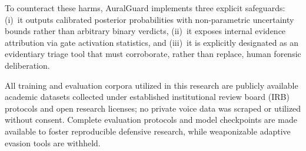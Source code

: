 To counteract these harms, AuralGuard implements three explicit safeguards:
(i)~it outputs calibrated posterior probabilities with non-parametric uncertainty bounds rather than arbitrary binary verdicts,
(ii)~it exposes internal evidence attribution via gate activation statistics, and
(iii)~it is explicitly designated as an evidentiary triage tool that must corroborate, rather than replace, human forensic deliberation. 

All training and evaluation corpora utilized in this research are publicly available academic datasets collected under established institutional review board (IRB) protocols and open research licenses; no private voice data was scraped or utilized without consent. Complete evaluation protocols and model checkpoints are made available to foster reproducible defensive research, while weaponizable adaptive evasion tools are withheld.
